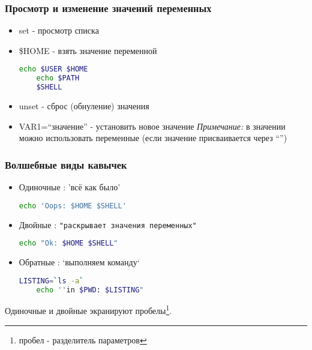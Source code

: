 \begin{frame}[fragile]
  \frametitle{Просмотр и изменение значений переменных}
  \normalsize{ }
  \begin{itemize}
    \item \alert{set} - просмотр списка \pause
    \item \alert{\$HOME} - взять значение переменной \pause
\begin{lstlisting}[language=sh,frame=single]
	echo $USER $HOME
	echo $PATH 
	$SHELL
\end{lstlisting} \pause 
    \item \alert{unset} - сброс (обнуление) значения \pause
    \item \alert{VAR1=``значение''} - установить новое значение \newline 
      \emph{Примечание:} в значении можно использовать переменные (если значение присваивается через ``'')
  \end{itemize}

\end{frame}

\begin{frame}[fragile]
  \frametitle{Волшебные виды кавычек}

  \begin{itemize}
    \item \alert{Одиночные} : 'всё как было'
\begin{lstlisting}[language=sh,frame=single]
	echo 'Oops: $HOME $SHELL'
\end{lstlisting} \pause
    \item \alert{Двойные} :  \verb+"раскрывает значения переменных"+
\begin{lstlisting}[language=sh,frame=single]
	echo "Ok: $HOME $SHELL"
\end{lstlisting} \pause
    \item \alert{Обратные} : `выполняем команду`
\begin{lstlisting}[language=sh,frame=single]
	LISTING=`ls -a`
	echo ''in $PWD: $LISTING"
\end{lstlisting}
  \end{itemize}
  Одиночные и двойные экранируют пробелы\footnote{пробел - разделитель параметров}.
\end{frame}

